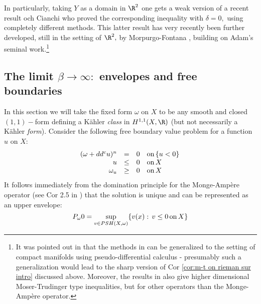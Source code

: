 \documentclass[11pt,oneside,english]{amsart}
\numberwithin{equation}{section}
\numberwithin{figure}{section}
\theoremstyle{plain}
\theoremstyle{plain}
\theoremstyle{plain}
\theoremstyle{plain}
\theoremstyle{remark}
\theoremstyle{definition}
\begin{document}
In particularly, taking $Y$ as a domain in $\R^{2}$ one gets a weak
version of a recent result och Cianchi \cite{ci} who proved the corresponding
inequality with $\delta=0,$ using completely different methods. This
latter result has very recently been further developed, still in the
setting of $\R^{2},$ by Morpurgo-Fontana \cite{f-m}, building on
Adam's seminal work.\footnote{It was pointed out in \cite{f-m} that the methods in \cite{f-m}
can be generalized to the setting of compact manifolds using pseudo-differential
calculus - presumably such a generalization would lead to the sharp
version of Cor \ref{cor:m-t on rieman sur intro} discussed above.
Moreover, the results in \cite{f-m} also give higher dimensional
Moser-Trudinger type inequalities, but for other operators than the
Monge-Ampère operator.}

\subsection{\label{sub:The-case-when beta is inf}The limit $\beta\rightarrow\infty:$
envelopes and free boundaries }

In this section we will take the fixed form $\omega$ on $X$ to be
any smooth and closed $(1,1)-$form defining a Kähler\emph{ class}
in $H^{1,1}(X,\R)$ (but not necessarily a Kähler \emph{form}). Consider
the following free boundary value problem for a function $u$ on $X:$
\begin{equation}
\begin{array}{rcll}
(\omega+dd^{c}u)^{n} & = & 0 & \mbox{on\,\ensuremath{\left\{ u<0\right\} }}\\
u & \leq & 0 & \mbox{on}\, X\\
\omega_{u} & \geq & 0 & \mbox{on}\, X
\end{array}\,\label{eq:free boundary}
\end{equation}
 It follows immediately from the domination principle for the Monge-Ampère
operator (see Cor 2.5 in \cite{begz}) that the solution is unique
and can be represented as an upper envelope: 
\begin{equation}
P_{\omega}0=\sup_{v\in PSH(X,\omega)}\{v(x):\, v\leq0\,\mbox{on\,}X\}\label{eq:envelope in beta inf}
\end{equation}
\end{document}

